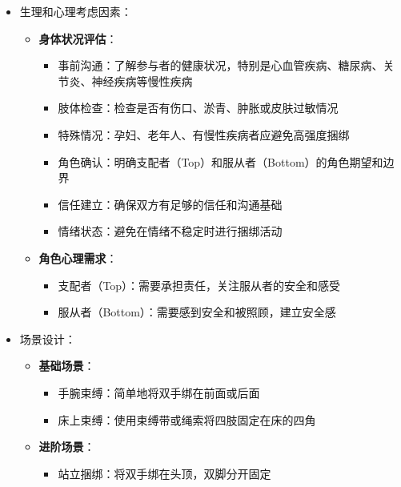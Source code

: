 \documentclass[12pt,UTF8]{ctexbook}
\begin{document}
\begin{itemize}
\begin{itemize}
\begin{itemize}
      \item 确保有快速解除捆绑的工具（如专门的安全剪刀，放在容易拿到的地方）
      \item 建立安全词或安全信号，确保参与者可以随时停止
      \end{itemize}
    \item 生理和心理考虑因素：
      \begin{itemize}
      \item \textbf{身体状况评估}：
        \begin{itemize}
        \item 事前沟通：了解参与者的健康状况，特别是心血管疾病、糖尿病、关节炎、神经疾病等慢性疾病
        \item 肢体检查：检查是否有伤口、淤青、肿胀或皮肤过敏情况
        \item 特殊情况：孕妇、老年人、有慢性疾病者应避免高强度捆绑
        \end{itemize}
        \begin{itemize}
        \item 角色确认：明确支配者（Top）和服从者（Bottom）的角色期望和边界
        \item 信任建立：确保双方有足够的信任和沟通基础
        \item 情绪状态：避免在情绪不稳定时进行捆绑活动
        \end{itemize}
      \item \textbf{角色心理需求}：
        \begin{itemize}
        \item 支配者（Top）：需要承担责任，关注服从者的安全和感受
        \item 服从者（Bottom）：需要感到安全和被照顾，建立安全感
        \end{itemize}
      \end{itemize}
    \item 场景设计：
      \begin{itemize}
      \item \textbf{基础场景}：
        \begin{itemize}
        \item 手腕束缚：简单地将双手绑在前面或后面
        \item 床上束缚：使用束缚带或绳索将四肢固定在床的四角
        \end{itemize}
      \item \textbf{进阶场景}：
        \begin{itemize}
        \item 站立捆绑：将双手绑在头顶，双脚分开固定

\end{itemize}
\end{itemize}
\end{itemize}
\end{itemize}
\end{document}
